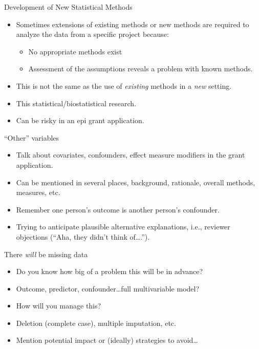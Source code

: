 \documentclass[ignorenonframetext,]{beamer}
\providecommand{\tightlist}{%
  \setlength{\itemsep}{0pt}\setlength{\parskip}{0pt}}
\begin{document}
\begin{frame}{Development of New Statistical Methods}
\protect\hypertarget{development-of-new-statistical-methods}{}

\begin{itemize}
\item
  Sometimes extensions of existing methods or new methods are required
  to analyze the data from a specific project because:

  \begin{itemize}
  \tightlist
  \item
    No appropriate methods exist
  \item
    Assessment of the assumptions reveals a problem with known methods.
  \end{itemize}
\item
  This is not the same as the use of \emph{existing} methods in a
  \emph{new} setting.
\item
  This statistical/biostatistical research.
\item
  Can be risky in an epi grant application.
\end{itemize}

\end{frame}

\begin{frame}{``Other'' variables}
\protect\hypertarget{other-variables}{}

\begin{itemize}
\item
  Talk about covariates, confounders, effect measure modifiers in the
  grant application.
\item
  Can be mentioned in several places, background, rationale, overall
  methods, measures, etc.
\item
  Remember one person's outcome is another person's confounder.
\item
  Trying to anticipate plausible alternative explanations, i.e.,
  reviewer objections (``Aha, they didn't think of\ldots{}.'').
\end{itemize}

\end{frame}

\begin{frame}{There \emph{will} be missing data}
\protect\hypertarget{there-will-be-missing-data}{}

\begin{itemize}
\item
  Do you know how big of a problem this will be in advance?
\item
  Outcome, predictor, confounder\ldots{}full multivariable model?
\item
  How will you manage this?
\item
  Deletion (complete case), multiple imputation, etc.
\item
  Mention potential impact or (ideally) strategies to avoid\ldots{}
\end{itemize}

\end{frame}
\end{document}
